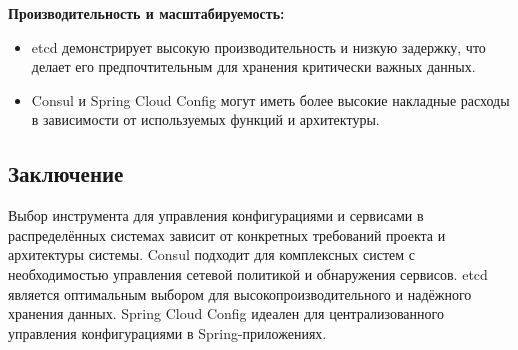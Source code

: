 \textbf{Производительность и масштабируемость:}
\begin{itemize}
    \item etcd демонстрирует высокую производительность и низкую задержку, что делает его предпочтительным для хранения критически важных данных.
    \item Consul и Spring Cloud Config могут иметь более высокие накладные расходы в зависимости от используемых функций и архитектуры.
\end{itemize}

\subsection{Заключение}

Выбор инструмента для управления конфигурациями и сервисами в распределённых системах зависит от конкретных
требований проекта и архитектуры системы.
Consul подходит для комплексных систем с необходимостью управления сетевой политикой и обнаружения сервисов.
etcd является оптимальным выбором для высокопроизводительного и надёжного хранения данных.
Spring Cloud Config идеален для централизованного управления конфигурациями в Spring-приложениях.
